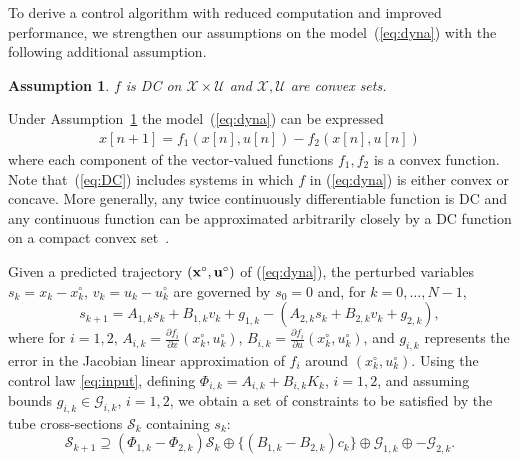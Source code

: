 \documentclass[a4paper, 10 pt, conference]{IEEEconf}
\newtheorem{assumption}{Assumption}
\def\G{\mathcal{G}}
\def\S{\mathcal{S}}
\def\U{\mathcal{U}}
\def\X{\mathcal{X}}
\begin{document}
To derive a control algorithm with reduced computation and improved performance, we strengthen our assumptions
on the model~(\ref{eq:dyna}) with the following additional assumption.

\begin{assumption}\label{assump:dc}
$f$ is DC on $\X\times\U$ and $\X,\U$ are convex sets.
\end{assumption}

Under Assumption~\ref{assump:dc} the model~(\ref{eq:dyna}) can be expressed
%
\begin{align}
\label{eq:DC}
x[n+1] 
=  f_1(x[n], u[n]) -  f_2(x[n], u[n]) 
\end{align}
where each component of the vector-valued functions $f_1, f_2$ is a convex function. 
%
Note that~(\ref{eq:DC}) includes systems in which $f$ in (\ref{eq:dyna}) is either convex or concave. 
%
More generally, any twice continuously differentiable function is DC and any continuous function can be approximated arbitrarily closely by a DC function on a compact convex set~\cite{horst99:dcprog,hartman59:dcfun}.

Given a predicted trajectory $({\bf x}^\circ, {\bf u}^\circ)$ of (\ref{eq:dyna}), the perturbed variables $s_k = x_k - x_k^\circ$, $v_k = u_k - u_k^\circ$ are governed by $s_0=0$ and, for $k=0,\ldots,N-1$,
%
\begin{equation*}
s_{k+1} =A_{1, k} s_k + B_{1, k} v_k + g_{1, k} - (A_{2, k} s_k + B_{2, k} v_k + g_{2, k}), 
\end{equation*}
where for $i=1,2$, $A_{i, k} = \frac{\partial f_i}{\partial x}(x_k^\circ, u_k^\circ)$, $B_{i, k} = \frac{\partial f_i}{\partial u}(x_k^\circ, u_k^\circ)$,
%
%
and $g_{i,k} $ represents the error in the Jacobian linear approximation of $f_i$ around $(x_k^\circ,u_k^\circ)$.
%
Using the control law \eqref{eq:input}, defining
$\Phi_{i, k}=A_{i, k}+B_{i, k} K_{k}$, $i =1, 2$, 
and assuming bounds $g_{i, k} \in \G_{i, k}$, $i=1,2$, we obtain a set of constraints to be satisfied by the tube cross-sections $\S_k$ containing $s_k$:
%
\begin{equation}
\label{eq:tube}
\S_{k+1} \supseteq (\Phi_{1, k} - \Phi_{2, k})\S_k \oplus \{ (B_{1, k} - B_{2, k}) c_k\} \oplus \G_{1, k} \oplus -\G_{2, k}. 
\end{equation}
\end{document}
